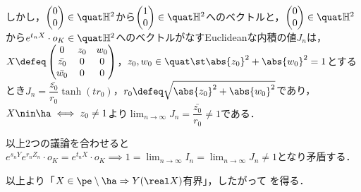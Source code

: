 \begin{npfwn}
  しかし，$
  \begin{pmatrix}
    0 \\ 0 
  \end{pmatrix}
  \in \quat\mathbb{H}^2 $から$
  \begin{pmatrix}
    1 \\ 0
  \end{pmatrix}
  \in \quat\mathbb{H}^2 $へのベクトルと，$
  \begin{pmatrix}
    0 \\ 0 
  \end{pmatrix}
  \in \quat\mathbb{H}^2 $から$e^{t_nX}\cdot o_K \in \quat \mathbb{H}^2 $へのベクトルがなすEuclideanな内積の値$J_n$は，$X \defeq   \begin{pmatrix}
    0 & z_0 & w_0 \\
    \bar{z_0} & 0 & 0 \\
    \bar{w_0} & 0 & 0 
  \end{pmatrix}$，$z_0,w_0\in \quat \st \abs{z_0}^2 +\abs{w_0}^2  = 1 $とするとき$J_n = \dfrac{\bar{z_0}}{r_0}\tanh (tr_0) $，$r_0\defeq \sqrt{\abs{z_0}^2 + \abs{w_0}^2 } $であり，$X\nin \ha \iff z_0\neq 1$より$\lim_{n\to \infty}J_n = \dfrac{\bar{z_0}}{r_0}\neq 1 $である．

  以上2つの議論を合わせると$e^{s_n Y}e^{r_n Z_n}\cdot o_K = e^{t_n X}\cdot o_K\implies 1 = \lim_{n\to \infty} I_n = \lim_{n\to \infty}J_n \neq 1 $となり矛盾する．
  

  以上より「$X\in \pe\setminus\ha \Rightarrow Y(\real X) $有界」，したがって  を得る．
  
\end{npfwn}


